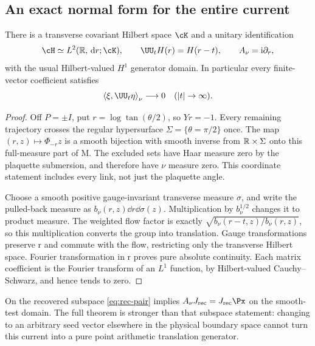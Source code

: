 \subsection{An exact normal form for the entire current}
\begin{theorem}\label{thm:current-spectrum}
There is a transverse covariant Hilbert space $\cK$ and a unitary
identification
\begin{equation}\label{eq:current-normal}
\cH\simeq L^2(\R,\dd r;\cK),\qquad
\UU_tH(r)=H(r-t),\qquad A_\nu=\ii\partial_r ,
\end{equation}
with the usual Hilbert-valued $H^1$ generator domain.
In particular every finite-vector coefficient satisfies
\begin{equation}\label{eq:current-decay}
\ip\xi{\UU_t\eta}_\nu\longrightarrow0\quad(|t|\to\infty).
\end{equation}
\end{theorem}
\begin{proof}
Off $P=\pm I$, put $r=\log\tan(\theta/2)$, so $Yr=-1$.
Every remaining trajectory crosses the regular hypersurface
$\Sigma=\{\theta=\pi/2\}$ once. The map
$(r,z)\mapsto\Phi_{-r}z$ is a smooth bijection with smooth
inverse from $\mathbb R\times\Sigma$ onto this full-measure part
of M. The excluded sets have Haar measure zero by the
plaquette submersion, and therefore have $\nu$ measure zero.
This coordinate statement includes every link, not just the
plaquette angle.

Choose a smooth positive gauge-invariant transverse measure
$\sigma$, and write the pulled-back measure as
$b_\nu(r,z)\dd r\dd\sigma(z)$. Multiplication by
$b_\nu^{1/2}$ changes it to product measure. The weighted
flow factor is exactly
$\sqrt{b_\nu(r-t,z)/b_\nu(r,z)}$, so this multiplication
converts the group into translation. Gauge transformations
preserve r and commute with the flow, restricting only the
transverse Hilbert space. Fourier transformation in r
proves pure absolute continuity. Each matrix coefficient is
the Fourier transform of an $L^1$ function, by Hilbert-valued
Cauchy--Schwarz, and hence tends to zero.
\end{proof}
On the recovered subspace \eqref{eq:rec-pair} implies
$A_\nu J_{\rm rec}=J_{\rm rec}\Px$ on the smooth-test domain.
The full theorem is stronger than that subspace statement:
changing to an arbitrary seed vector elsewhere in the physical
boundary space cannot turn this current into a pure point
arithmetic translation generator.
